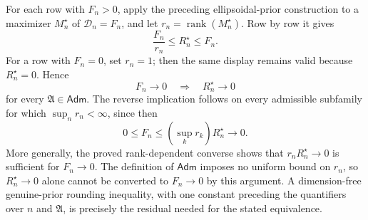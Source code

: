 For each row with \(F_n>0\), apply the preceding ellipsoidal-prior construction to a maximizer \(M_n^{\star}\) of \(\mathcal D_n=F_n\), and let \(r_n=\operatorname{rank}(M_n^{\star})\).  Row by row it gives
\[
 \frac{F_n}{r_n}\le R_n^{\star}\le F_n.
\]
For a row with \(F_n=0\), set \(r_n=1\); then the same display remains valid because \(R_n^{\star}=0\).  Hence
\[
 F_n\longrightarrow0\quad\Longrightarrow\quad R_n^{\star}\longrightarrow0
\]
for every \(\mathfrak A\in\mathsf{Adm}\).  The reverse implication follows on every admissible subfamily for which \(\sup_n r_n<\infty\), since then
\[
 0\le F_n\le\left(\sup_k r_k\right)R_n^{\star}\longrightarrow0.
\]
More generally, the proved rank-dependent converse shows that \(r_nR_n^{\star}\to0\) is sufficient for \(F_n\to0\).  The definition of \(\mathsf{Adm}\) imposes no uniform bound on \(r_n\), so \(R_n^{\star}\to0\) alone cannot be converted to \(F_n\to0\) by this argument.  A dimension-free genuine-prior rounding inequality, with one constant preceding the quantifiers over \(n\) and \(\mathfrak A\), is precisely the residual needed for the stated equivalence.